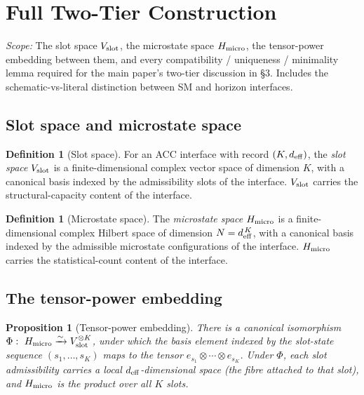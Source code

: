 \documentclass[11pt]{article}
\theoremstyle{plain}
\newtheorem{proposition}[theorem]{Proposition}
\theoremstyle{definition}
\newtheorem{definition}[theorem]{Definition}
\theoremstyle{remark}
\begin{document}
\section{Full Two-Tier Construction}\label{supp:C}

\noindent\textit{Scope:} The slot space $V_{\rm slot}$, the microstate space $H_{\rm micro}$, the tensor-power embedding between them, and every compatibility / uniqueness / minimality lemma required for the main paper's two-tier discussion in \S3.  Includes the schematic-vs-literal distinction between SM and horizon interfaces.

\bigskip

\subsection{Slot space and microstate space}\label{supp:C1}

\begin{definition}[Slot space]\label{def:V_slot}
For an ACC interface with record $(K, d_{\rm eff})$, the \emph{slot space} $V_{\rm slot}$ is a finite-dimensional complex vector space of dimension $K$, with a canonical basis indexed by the admissibility slots of the interface.  $V_{\rm slot}$ carries the structural-capacity content of the interface.
\end{definition}

\begin{definition}[Microstate space]\label{def:H_micro}
The \emph{microstate space} $H_{\rm micro}$ is a finite-dimensional complex Hilbert space of dimension $N = d_{\rm eff}^{\,K}$, with a canonical basis indexed by the admissible microstate configurations of the interface.  $H_{\rm micro}$ carries the statistical-count content of the interface.
\end{definition}

\subsection{The tensor-power embedding}\label{supp:C2}

\begin{proposition}[Tensor-power embedding]\label{prop:tensor_power}
There is a canonical isomorphism $\Phi :\ H_{\rm micro} \xrightarrow{\sim} V_{\rm slot}^{\otimes K}$, under which the basis element indexed by the slot-state sequence $(s_1, \dots, s_K)$ maps to the tensor $e_{s_1} \otimes \cdots \otimes e_{s_K}$.  Under $\Phi$, each slot admissibility carries a local $d_{\rm eff}$-dimensional space (the fibre attached to that slot), and $H_{\rm micro}$ is the product over all $K$ slots.
\end{proposition}
\end{document}
